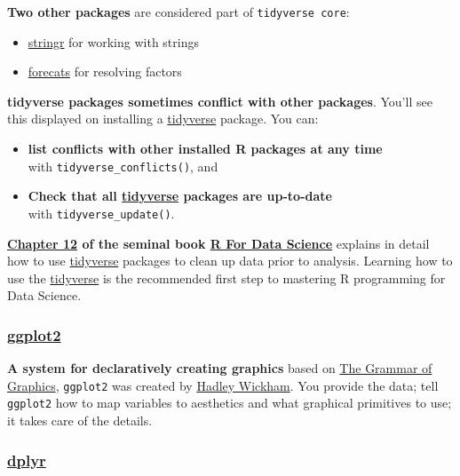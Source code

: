 \documentclass[]{book}
\providecommand{\tightlist}{%
  \setlength{\itemsep}{0pt}\setlength{\parskip}{0pt}}
\theoremstyle{definition}
\theoremstyle{definition}
\theoremstyle{definition}
\theoremstyle{remark}
\begin{document}
\textbf{Two other packages} are considered part of
\texttt{tidyverse\ core}:

\begin{itemize}
\tightlist
\item
  \href{http://stringr.tidyverse.org/}{stringr} for working with strings
\item
  \href{http://forcats.tidyverse.org/}{forecats} for resolving factors
\end{itemize}

\textbf{tidyverse packages sometimes conflict with other packages}.
You'll see this displayed on installing a
\href{https://www.tidyverse.org/}{tidyverse} package. You can:

\begin{itemize}
\item
  \textbf{list conflicts with other installed R packages at any time}\\
  with \texttt{tidyverse\_conflicts()}, and
\item
  \textbf{Check that all \href{https://www.tidyverse.org/}{tidyverse}
  packages are up-to-date}\\
  with \texttt{tidyverse\_update()}.
\end{itemize}

\textbf{\href{http://r4ds.had.co.nz/tidy-data.html}{Chapter 12} of the
seminal book \href{http://r4ds.had.co.nz/}{R For Data Science}} explains
in detail how to use \href{https://www.tidyverse.org/}{tidyverse}
packages to clean up data prior to analysis. Learning how to use the
\href{http://tidyverse.org/}{tidyverse} is the recommended first step to
mastering R programming for Data Science.

\hypertarget{ggplot2}{%
\subsubsection{\texorpdfstring{\href{http://ggplot2.tidyverse.org/}{ggplot2}}{ggplot2}}\label{ggplot2}}

\textbf{A system for declaratively creating graphics} based on
\href{vita.had.co.nz/papers/layered-grammar.pdf}{The Grammar of
Graphics}, \texttt{ggplot2} was created by
\href{http://hadley.nz/}{Hadley Wickham}. You provide the data; tell
\texttt{ggplot2} how to map variables to aesthetics and what graphical
primitives to use; it takes care of the details.

\hypertarget{dplyr}{%
\subsubsection{\texorpdfstring{\href{http://dplyr.tidyverse.org/}{dplyr}}{dplyr}}\label{dplyr}}
\end{document}
